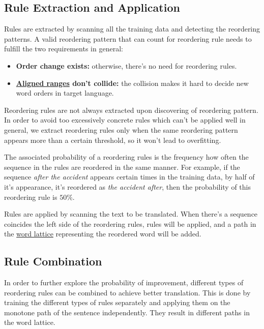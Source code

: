 \subsection{Rule Extraction and Application}
\label{general}

Rules are extracted by scanning all the training data and detecting the reordering patterns. A valid reordering pattern that can count for reordering rule needs to fulfill the two requirements in general:
\begin{itemize}
\setlength{\itemsep}{0cm}%
\setlength{\parskip}{0cm}%
\item \textbf{Order change exists:} otherwise, there's no need for reordering rules.
\item \textbf{\hyperref[alignedrange]{Aligned ranges} don't collide:} the collision makes it hard to decide new word orders in target language.
\end{itemize}

Reordering rules are not always extracted upon discovering of reordering pattern. In order to avoid too excessively concrete rules which can't be applied well in general, we extract reordering rules only when the same reordering pattern appears more than a certain threshold, so it won't lead to overfitting.

The associated probability of a reordering rules is the frequency how often the sequence in the rules are reordered in the same manner. For example, if the sequence \emph{after the accident} appears certain times in the training data, by half of it's appearance, it's reordered as \emph{the accident after}, then the probability of this reordering rule is $50\%$.

Rules are applied by scanning the text to be translated. When there's a sequence coincides the left side of the reordering rules, rules will be applied, and a path in the \hyperref[ch:Foundations:sec:Lattices]{word lattice} representing the reordered word will be added.

\subsection{Rule Combination}

In order to further explore the probability of improvement, different types of reordering rules can be combined to achieve better translation. This is done by training the different types of rules separately and applying them on the monotone path of the sentence independently. They result in different paths in the word lattice.

